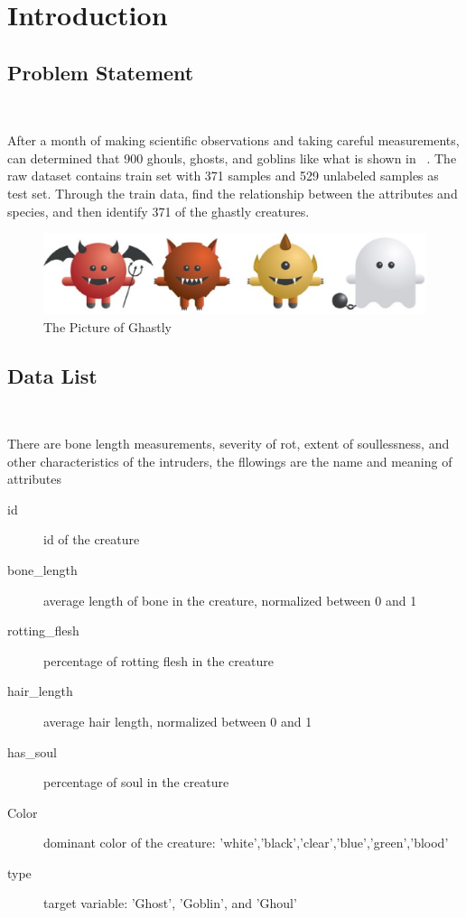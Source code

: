 
\section{Introduction}\label{sec-intro}

\subsection{Problem Statement}
\

After a month of making scientific observations 
and taking careful measurements, 
can determined that 900 ghouls, ghosts, and goblins
like what is shown in~  .
The raw dataset contains train set with 371 
samples and 529 unlabeled samples as test set.
Through the train data, find the relationship
between the attributes and species, 
and then identify 371 of the ghastly creatures.


\begin{figure}[htbp]
	\centering
	\includegraphics[scale=0.3]{figures/bar.eps}
	\caption{The Picture of Ghastly}\label{fig:animal}
\end{figure}


\subsection{Data List}
\

There are bone length measurements, 
severity of rot, extent of soullessness, 
and other characteristics of the intruders,
the fllowings are the  
name and meaning of attributes


\begin{description}
	\item[id] id of the creature
	\item[bone\_length] average length of bone in the creature, normalized between 0 and 1
	\item[rotting\_flesh] percentage of rotting flesh in the creature
	\item[hair\_length] average hair length, normalized between 0 and 1
	\item[has\_soul] percentage of soul in the creature
	\item[Color] dominant color of the creature: 'white','black','clear','blue','green','blood'
	\item[type] target variable: 'Ghost', 'Goblin', and 'Ghoul'
\end{description}


